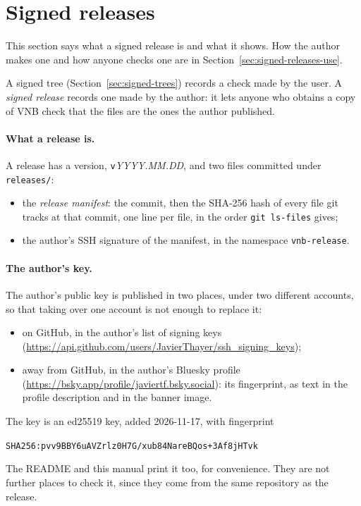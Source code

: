 \section{Signed releases}
\label{sec:signed-releases}

This section says what a signed release is and what it shows.  How the
author makes one and how anyone checks one are in
Section~\ref{sec:signed-releases-use}.

A signed tree (Section~\ref{sec:signed-trees}) records a check made by
the user.  A \emph{signed release} records one made by the author: it
lets anyone who obtains a copy of VNB check that the files are the
ones the author published.

\paragraph{What a release is.}  A release has a version,
\texttt{v}\textit{YYYY.MM.DD}, and two files committed under
\texttt{releases/}:
\begin{itemize}
\item the \emph{release manifest}: the commit, then the SHA-256 hash of
  every file git tracks at that commit, one line per file, in the order
  \texttt{git ls-files} gives;
\item the author's SSH signature of the manifest, in the namespace
  \texttt{vnb-release}.
\end{itemize}

\paragraph{The author's key.}  The author's public key is published in two places, under two
different accounts, so that taking over one account is not enough to
replace it:
\begin{itemize}
\item on GitHub, in the author's list of signing keys
  (\url{https://api.github.com/users/JavierThayer/ssh_signing_keys});
\item away from GitHub, in the author's Bluesky profile
  (\url{https://bsky.app/profile/javiertf.bsky.social}): its
  fingerprint, as text in the profile description and in the banner
  image.
\end{itemize}
The key is an ed25519 key, added 2026-11-17, with fingerprint
\begin{center}
\texttt{SHA256:pvv9BBY6uAVZrlz0H7G/xub84NareBQos+3Af8jHTvk}
\end{center}
The README and this manual print it too, for convenience.  They are
not further places to check it, since they come from the same
repository as the release.

